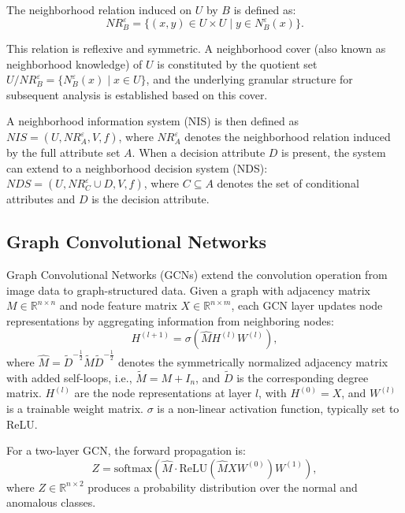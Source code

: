 \documentclass[lettersize,journal]{IEEEtran}
\begin{document}
The neighborhood relation induced on \(U\) by \(B\) is defined as:
\begin{equation}
NR_{B}^{\varepsilon} = \{(x, y) \in U \times U \mid y \in N_{B}^{\varepsilon}(x)\}.
\end{equation}

This relation is reflexive and symmetric. A neighborhood cover (also known as neighborhood knowledge)
of \(U\) is constituted by the quotient set
\(U / NR_{B}^{\varepsilon} = \{N_{B}^{\varepsilon}(x) \mid x \in U\}\), and the underlying granular
structure for subsequent analysis is established based on this cover.

A neighborhood information system (NIS) is then defined as
\(NIS = (U, NR_{A}^{\varepsilon}, V, f)\), where \(NR_{A}^{\varepsilon}\) denotes the neighborhood
relation induced by the full attribute set \(A\). When a decision attribute \(D\) is present, the system
can extend to a neighborhood decision system (NDS):
\(NDS = (U, NR_{C}^{\varepsilon} \cup D, V, f)\), where \(C \subseteq A\) denotes the set of conditional
attributes and \(D\) is the decision attribute.

\subsection{Graph Convolutional Networks}

Graph Convolutional Networks (GCNs) \cite{ref21} extend the convolution operation from image data to
graph-structured data. Given a graph with adjacency matrix \(M \in \mathbb{R}^{n \times n}\) and node
feature matrix \(X \in \mathbb{R}^{n \times m}\), each GCN layer updates node representations by
aggregating information from neighboring nodes:
\begin{equation}
H^{(l+1)} = \sigma\left( \widehat{M} H^{(l)} W^{(l)} \right),
\end{equation}
where \(\widehat{M} = \widetilde{D}^{-\frac{1}{2}} \widetilde{M} \widetilde{D}^{-\frac{1}{2}}\) denotes
the symmetrically normalized adjacency matrix with added self-loops, i.e.,
\(\widetilde{M} = M + I_{n}\), and \(\widetilde{D}\) is the corresponding degree matrix.
\(H^{(l)}\) are the node representations at layer \(l\), with \(H^{(0)} = X\), and \(W^{(l)}\) is a
trainable weight matrix. \(\sigma\) is a non-linear activation function, typically set to ReLU.

For a two-layer GCN, the forward propagation is:
\begin{equation}
Z = \text{softmax}\left( \widehat{M} \cdot \text{ReLU}\left( \widehat{M} X W^{(0)} \right) W^{(1)} \right),
\end{equation}
where \(Z \in \mathbb{R}^{n \times 2}\) produces a probability distribution over the normal and anomalous classes.
\end{document}
